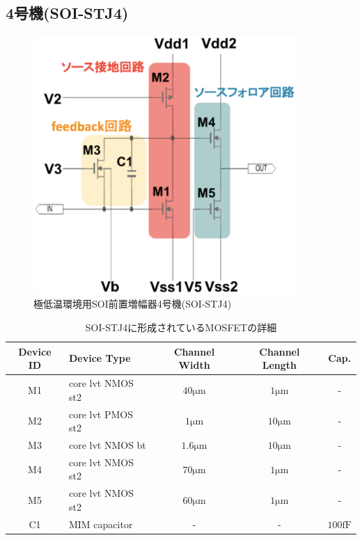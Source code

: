 	\subsection{4号機(SOI-STJ4)}
		\begin{figure}[htbp]
			\begin{center}
				\includegraphics[width=10.0cm]{./Chapter/Chapter3/Picture/SOISTJ4_circuit.eps}
				\caption{極低温環境用SOI前置増幅器4号機(SOI-STJ4)}
				\label{fig:SOISTJ4_circuit}
			\end{center}
		\end{figure}
		\begin{table}[htb]
			\begin{center}
				\begin{tabular}{| c | l | c | c | c |} \hline
					Device ID & Device Type & Channel Width & Channel Length & Cap. \\ \hline \hline
					M1 & core lvt NMOS st2 & $40 \mathrm{\mu m}$ & $1 \mathrm{\mu m}$ & - \\ \hline
					M2 & core lvt PMOS st2 & $1 \mathrm{\mu m}$ & $10 \mathrm{\mu m}$ & - \\ \hline
					M3 & core lvt NMOS bt & $1.6 \mathrm{\mu m}$ & $10 \mathrm{\mu m}$ & - \\ \hline
					M4 & core lvt NMOS st2 & $70 \mathrm{\mu m}$ & $1 \mathrm{\mu m}$ & - \\ \hline
					M5 & core lvt NMOS st2 & $60 \mathrm{\mu m}$ & $1 \mathrm{\mu m}$ & - \\ \hline
					C1 & MIM capacitor & - & - & $100 \mathrm{fF}$ \\ \hline
				\end{tabular}
				\caption{SOI-STJ4に形成されているMOSFETの詳細}
				\label{tab:SOISTJ4_detail}
			\end{center}
		\end{table}
